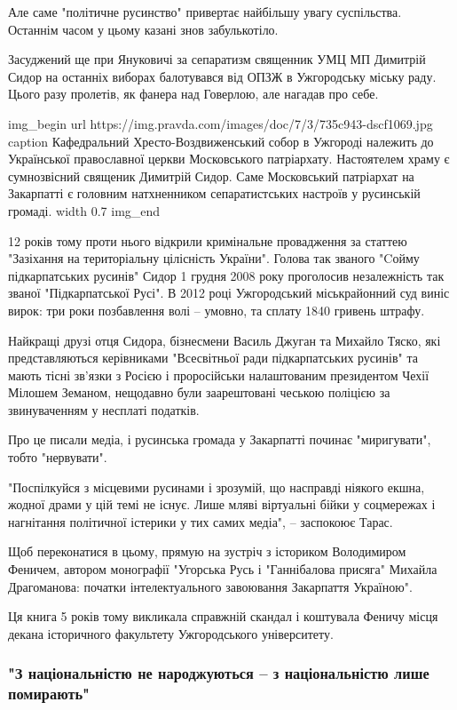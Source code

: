 Але саме "політичне русинство" привертає найбільшу увагу суспільства. Останнім
часом у цьому казані знов забулькотіло.

Засуджений ще при Януковичі за сепаратизм священник УМЦ МП Димитрій Сидор на
останніх виборах балотувався від ОПЗЖ в Ужгородську міську раду. Цього разу
пролетів, як фанера над Говерлою, але нагадав про себе.

\ifcmt
img_begin 
        url https://img.pravda.com/images/doc/7/3/735c943-dscf1069.jpg
        caption Кафедральний Хресто-Воздвиженський собор в Ужгороді належить до Української православної церкви Московського патріархату. Настоятелем храму є сумнозвісний священик Димитрій Сидор. Саме Московський патріархат на Закарпатті є головним натхненником сепаратистських настроїв у русинській громаді.
        width 0.7
img_end
\fi

12 років тому проти нього відкрили кримінальне провадження за статтею
"Зазіхання на територіальну цілісність України". Голова так званого "Cойму
підкарпатських русинів" Сидор 1 грудня 2008 року проголосив незалежність так
званої "Підкарпатської Русі". В 2012 році Ужгородський міськрайонний суд виніс
вирок: три роки позбавлення волі – умовно, та сплату 1840 гривень штрафу.

Найкращі друзі отця Сидора, бізнесмени Василь Джуган та Михайло Тяско, які
представляються керівниками "Всесвітньої ради підкарпатських русинів" та мають
тісні зв'язки з Росією і проросійськи налаштованим президентом Чехії Мілошем
Земаном, нещодавно були заарештовані чеською поліцією за звинуваченням у
несплаті податків.

Про це писали медіа, і русинська громада у Закарпатті починає "миригувати",
тобто "нервувати".

"Поспілкуйся з місцевими русинами і зрозумій, що насправді ніякого екшна,
жодної драми у цій темі не існує. Лише мляві віртуальні бійки у соцмережах і
нагнітання політичної істерики у тих самих медіа", – заспокоює Тарас.

Щоб переконатися в цьому, прямую на зустріч з істориком Володимиром Феничем,
автором монографії "Угорська Русь і "Ганнібалова присяга" Михайла Драгоманова:
початки інтелектуального завоювання Закарпаття Україною".

Ця книга 5 років тому викликала справжній скандал і коштувала Феничу місця
декана історичного факультету Ужгородського університету. 

\subsubsection{"З національністю не народжуються – з національністю лише
помирають"}

